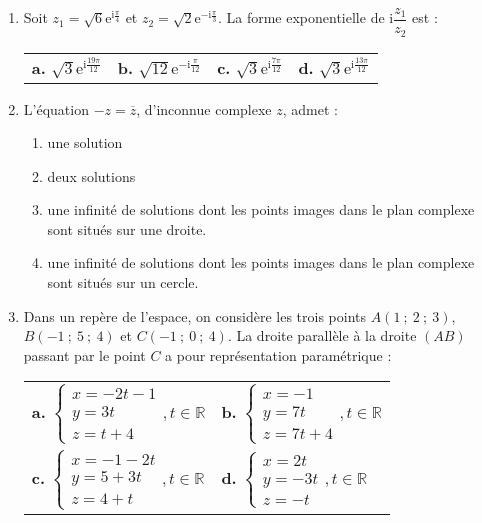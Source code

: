 \documentclass[10pt]{article}
\begin{document}
\begin{enumerate}
\item Soit $z_1 = \sqrt{6} \text{e}^{\text{i} \frac{\pi}{4}}$ et $z_2 = \sqrt{2} \text{e}^{-\text{i} \frac{\pi}{3}}$. La forme exponentielle de $\text{i} \dfrac{z_1}{z_2}$ est :

\begin{tabularx}{1.0\linewidth}{XXXX}
\textbf{a.} $\sqrt{3}\text{e}^{\text{i} \frac{19\pi}{12}}$ & 
\textbf{b.} $\sqrt{12} \text{e}^{-\text{i} \frac{\pi}{12}}$ & 
\textbf{c.} $\sqrt{3}\text{e}^{\text{i} \frac{7\pi}{12}}$ & 
\textbf{d.} $\sqrt{3}\text{e}^{\text{i} \frac{13\pi}{12}}$
\end{tabularx}

\item L'équation $- z = \overline z$, d'inconnue complexe $z$, admet :
	\begin{enumerate}
		\item une solution
		\item deux solutions
		\item une infinité de solutions dont les points images dans le plan complexe sont situés sur une droite.
		\item une infinité de solutions dont les points images dans le plan complexe sont situés sur un cercle.
	\end{enumerate}
\item Dans un repère de l'espace, on considère les trois points $A(1~;~2~;~3)$, $B(-1~;~5~;~4)$ et $C(-1~;~0~;~4)$. La droite parallèle à la droite $(AB)$ passant par le point $C$ a pour représentation paramétrique :

\begin{tabularx}{1.0\linewidth}{XX}
\textbf{a.} $\begin{cases}
      x = -2t-1 \\ y=3t \\ z=t+4
    \end{cases}, t\in \mathbb{R}$ & 
\textbf{b.} $\begin{cases}
      x=-1 \\ y=7t \\ z=7t+4
    \end{cases}, t \in \mathbb{R}$ \\
\textbf{c.} $\begin{cases}
      x=-1-2t \\ y=5+3t \\ z=4+t
    \end{cases}, t \in \mathbb{R}$ &
\textbf{d.} $\begin{cases}
      x=2t \\ y=-3t \\ z=-t
    \end{cases}, t \in \mathbb{R}$
\end{tabularx}


\end{enumerate}
\end{document}
